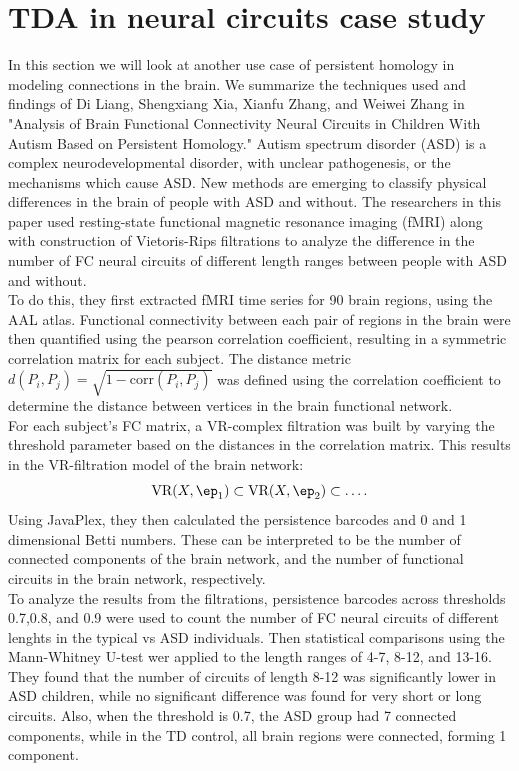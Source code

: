 \documentclass[12pt]{exam}
\begin{document}
\section{TDA in neural circuits case study}
	In this section we will look at another use case of persistent homology in modeling connections in the brain. We summarize the techniques used and findings of Di Liang, Shengxiang Xia, Xianfu Zhang, and Weiwei Zhang in "Analysis of Brain Functional Connectivity Neural Circuits in Children With Autism Based on Persistent Homology." Autism spectrum disorder (ASD) is a complex neurodevelopmental disorder, with unclear pathogenesis, or the mechanisms which cause ASD. New methods are emerging to classify physical differences in the brain of people with ASD and without. The researchers in this paper used resting-state functional magnetic resonance imaging (fMRI) along with construction of Vietoris-Rips filtrations to analyze the difference in the number of FC neural circuits of different length ranges between people with ASD and without. \\

	To do this, they first extracted fMRI time series for 90 brain regions, using the AAL atlas. Functional connectivity between each pair of regions in the brain were then quantified using the pearson correlation coefficient, resulting in a symmetric correlation matrix for each subject. The distance metric $d(P_i,P_j) = \sqrt{1-\text{corr}(P_i,P_j)} $ was defined using the correlation coefficient to determine the distance between vertices in the brain functional network. \\

	For each subject's FC matrix, a VR-complex filtration was built by varying the threshold parameter based on the distances in the correlation matrix. This results in the VR-filtration model of the brain network:
	\[
	\text{VR}(X,\ep_1) \subset \text{VR}(X,\ep_2) \subset  \ldots
	.\] 
Using JavaPlex, they then calculated the persistence barcodes and 0 and 1 dimensional Betti numbers. These can be interpreted to be the number of connected components of the brain network, and the number of functional circuits in the brain network, respectively. \\

To analyze the results from the filtrations, persistence barcodes across thresholds 0.7,0.8, and 0.9 were used to count the number of FC neural circuits of different lenghts in the typical vs ASD individuals. Then statistical comparisons using the Mann-Whitney U-test wer applied to the length ranges of 4-7, 8-12, and 13-16. They found that the number of circuits of length 8-12 was significantly lower in ASD children, while no significant difference was found for very short or long circuits. Also, when the threshold is 0.7, the ASD group had 7 connected components, while in the TD control, all brain regions were connected, forming 1 component. \\
\end{document}
